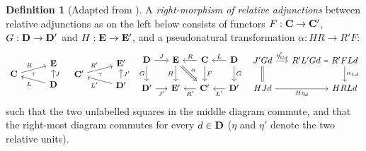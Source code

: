 \documentclass[11pt,a4paper]{article}
\theoremstyle{plain}
\theoremstyle{definition}
\newtheorem{definition}[theorem]{Definition}
\theoremstyle{remark}
\begin{document}
\begin{definition}[Adapted from \cite{RM}]
A \emph{right-morphism of relative adjunctions} between relative adjunctions as on the left below consists of functors $F: \mathbf{C} \to \mathbf{C}'$, $G : \mathbf{D} \to \mathbf{D}'$ and $H : \mathbf{E} \to \mathbf{E}'$, and a pseudonatural transformation $\alpha: HR \to R'F$:
\[
\begin{tikzcd}[row sep=-0.2em, column sep=1em]
	&& \bE \\
	\bC \\
	& {} & \bD
	\arrow[""{name=0, anchor=center, inner sep=0}, "R", from=2-1, to=1-3]
	\arrow["J"', from=3-3, to=1-3]
	\arrow[""{name=1, anchor=center, inner sep=0}, "L", from=3-3, to=2-1]
	\arrow["\dashv"{anchor=center, rotate=90}, draw=none, from=1, to=0]
\end{tikzcd}\quad 
\begin{tikzcd}[row sep=-0.2em, column sep=1em]
	&& \bE' \\
	\bC' \\
	& {} & \bD'
	\arrow[""{name=0, anchor=center, inner sep=0}, "R'", from=2-1, to=1-3]
	\arrow["J'"', from=3-3, to=1-3]
	\arrow[""{name=1, anchor=center, inner sep=0}, "L'", from=3-3, to=2-1]
	\arrow["\dashv"{anchor=center, rotate=90}, draw=none, from=1, to=0]
\end{tikzcd}
\ \  
\begin{tikzcd}[column sep=1.4em]
	\bD & \bE & \bC & \bD \\
	{\bD'} & {\bE'} & {\bC'} & {\bD'}
	\arrow["J", from=1-1, to=1-2]
	\arrow["G"', from=1-1, to=2-1]
	\arrow["H"', from=1-2, to=2-2]
	\arrow["R"', from=1-3, to=1-2]
	\arrow["\alpha", Rightarrow, from=1-2, to=2-3]
    \arrow["F", from=1-3, to=2-3]
	\arrow["L"', from=1-4, to=1-3]
	\arrow["G", from=1-4, to=2-4]
	\arrow["{{J'}}"', from=2-1, to=2-2]
	\arrow["{{R'}}", from=2-3, to=2-2]
	\arrow["{{L'}}", from=2-4, to=2-3]
\end{tikzcd}
\ \ 
\begin{tikzcd}[column sep=1.4em]
	{J'Gd} & {R'L'Gd} &[-1em] {R'FLd} \\
	HJd && HRLd
	\arrow["{\eta'_{Gd}}", from=1-1, to=1-2]
	\arrow[equals, from=1-1, to=2-1]
	\arrow[equals, from=1-2, to=1-3]
	\arrow["{\alpha_{Ld}}", from=1-3, to=2-3]
	\arrow["{H\eta_d}"', from=2-1, to=2-3]
\end{tikzcd}
\]
such that the two unlabelled squares in the middle diagram commute, and that the right-most diagram commutes for every $d \in \mathbf{D}$ ($\eta$ and $\eta'$ denote the two relative units).

\end{definition}
\end{document}

